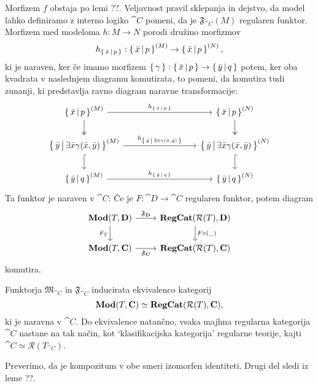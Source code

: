 \documentclass[../kategoricna_logika.tex]{subfiles}
\begin{document}
Morfizem $f$ obstaja po lemi ??. Veljavnost pravil sklepanja in dejstvo, da model lahko definiramo z interno logiko $\cat{C}$ pomeni, da je $\mathfrak{F}_{\cat{C}}(M)$ regularen funktor.
Morfizem med modeloma $h : M \to N$ porodi družino morfizmov 
$$h_{\left\lbrace\,\bar{x}\,\middle|\, p\,\right\rbrace} : \left\lbrace\,\bar{x}\,\middle|\, p\,\right\rbrace^{(M)} \to \left\lbrace\,\bar{x}\,\middle|\, p\,\right\rbrace^{(N)},$$
ki je naraven, ker če imamo morfizem $\left\lbrace\,\gamma\,\right\rbrace : \left\lbrace\,\bar{x}\,\middle|\, p\,\right\rbrace \to \left\lbrace\,\bar{y}\,\middle|\, q\,\right\rbrace$ potem, ker oba kvadrata v naslednjem diagramu komutirata, to pomeni, da komutira tudi zunanji, ki predstavlja ravno diagram naravne transformacije:
\begin{equation*}
  \begin{tikzcd}[column sep=3cm]
    \set{\bar{x}\,\middle|\, p}^{(M)} \ar[d, two heads] \ar[r, "h_{\set{\bar{x}\,\middle|\, p}}"] & \set{\bar{x}\,\middle|\, p}^{(N)} \ar[d, two heads] \\
    \set{\bar{y}\,\middle|\, \exists \bar{x} \gamma(\bar{x}, \bar{y})}^{(M)}  \ar[d, hook] \ar[r, "h_{\set{\bar{y}\,\middle|\, \exists \bar{x} \gamma(\bar{x}, \bar{y})}}"] & \set{\bar{y}\,\middle|\, \exists \bar{x} \gamma(\bar{x}, \bar{y})}^{(N)} \ar[d, hook] \\
    \set{\bar{y}\,\middle|\, q}^{(M)} \ar[r, "h_{\set{\bar{y}\,\middle|\, q}}"] & \set{\bar{y}\,\middle|\, q}^{(N)}
  \end{tikzcd}
\end{equation*}
Ta funktor je naraven v $\cat{C}$: Če je $F : \cat{D} \to \cat{C}$ regularen funktor, potem diagram
\begin{equation}
  \begin{tikzcd}
    \Mod(T, \cat{D}) \ar[d, "F_T"'] \ar[r, "\mathfrak{F}_{\cat{D}}"] & \cat{RegCat}(\mathcal{R}(T), \cat{D}) \ar[d, "F \circ (\_)"] \\
    \Mod(T, \cat{C}) \ar[r, "\mathfrak{F}_{\cat{C}}"'] & \cat{RegCat}(\mathcal{R}(T), \cat{C})
  \end{tikzcd}
\end{equation}
komutira.
\begin{izrek}
  Funktorja $\mathfrak{M}_{\cat{C}}$ in $\mathfrak{F}_{\cat{C}}$ inducirata ekvivalenco kategorij
  $$\mathbf{Mod}(T, {\operatorname{\mathbf{C}}}) \simeq {\operatorname{\mathbf{RegCat}}}(\mathcal{R}(T), {\operatorname{\mathbf{C}}}),$$
  ki je naravna v $\cat{C}$. Do ekvivalence natančno, vsaka majhna regularna kategorija $\cat{C}$ nastane na tak način, kot `klasifikacijska kategorija' regularne teorije, kajti $\cat{C} \simeq \mathcal{R}(T_{\cat{C}})$.
\end{izrek}
\begin{dokaz}
  Preverimo, da je kompozitum v obe smeri izomorfen identiteti. Drugi del sledi iz leme ??.
\end{dokaz}
\end{document}
